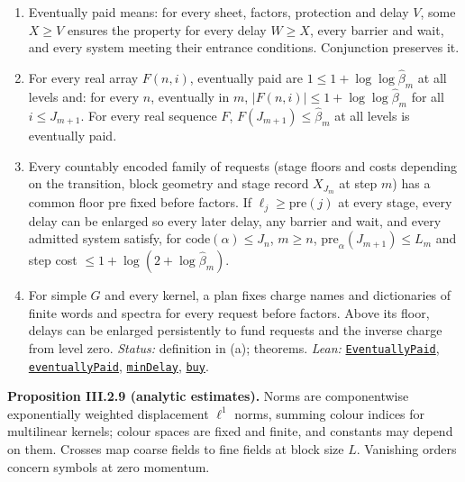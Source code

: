 \documentclass[
  letterpaper,
  11pt]{article}
\begin{document}
\begin{enumerate}
\def\labelenumi{(\alph{enumi})}
\item
  Eventually paid means: for every sheet, factors, protection and delay
  \(V\), some \(X\ge V\) ensures the property for every delay
  \(W\ge X\), every barrier and wait, and every system meeting their
  entrance conditions. Conjunction preserves it.
\item
  For every real array \(F(n,i)\), eventually paid are
  \(1\le1+\log\log\hat\beta_m\) at all levels and: for every \(n\),
  eventually in \(m\), \(|F(n,i)|\le1+\log\log\hat\beta_m\) for all
  \(i\le J_{m+1}\). For every real sequence \(F\),
  \(F(J_{m+1})\le\hat\beta_m\) at all levels is eventually paid.
\item
  Every countably encoded family of requests (stage floors and costs
  depending on the transition, block geometry and stage record
  \(X_{J_m}\) at step \(m\)) has a common floor \(\mathrm{pre}\) fixed
  before factors. If \(\ell_j\ge\mathrm{pre}(j)\) at every stage, every
  delay can be enlarged so every later delay, any barrier and wait, and
  every admitted system satisfy, for \(\mathrm{code}(\alpha)\le J_n\),
  \(m\ge n\), \(\mathrm{pre}_\alpha(J_{m+1})\le L_m\) and step cost
  \(\le1+\log(2+\log\hat\beta_m)\).
\item
  For simple \(G\) and every kernel, a plan fixes charge names and
  dictionaries of finite words and spectra for every request before
  factors. Above its floor, delays can be enlarged persistently to fund
  requests and the inverse charge from level zero. \emph{Status:}
  definition in (a); theorems. \emph{Lean:}
  \href{https://github.com/yang-mills-group/OpenAI-YM-20261028/blob/3456e5e75cf8d4cd558955a5c7638fba2d68f464/YM/R2I/Campaign/Clock.lean\#L36-L38}{\texttt{EventuallyPaid}},
  \href{https://github.com/yang-mills-group/OpenAI-YM-20261028/blob/3456e5e75cf8d4cd558955a5c7638fba2d68f464/YM/Integration/NativeDiagonalClockRequest.lean\#L52-L79}{\texttt{eventuallyPaid}},
  \href{https://github.com/yang-mills-group/OpenAI-YM-20261028/blob/3456e5e75cf8d4cd558955a5c7638fba2d68f464/YM/RG08/Calendar/Base.lean\#L68-L77}{\texttt{minDelay}},
  \href{https://github.com/yang-mills-group/OpenAI-YM-20261028/blob/3456e5e75cf8d4cd558955a5c7638fba2d68f464/YM/Integration/CalendarTreasuryPurchase.lean\#L42-L64}{\texttt{buy}}.
\end{enumerate}

\textbf{Proposition III.2.9 (analytic estimates).} Norms are
componentwise exponentially weighted displacement \(\ell^1\) norms,
summing colour indices for multilinear kernels; colour spaces are fixed
and finite, and constants may depend on them. Crosses map coarse fields
to fine fields at block size \(L\). Vanishing orders concern symbols at
zero momentum.
\end{document}

